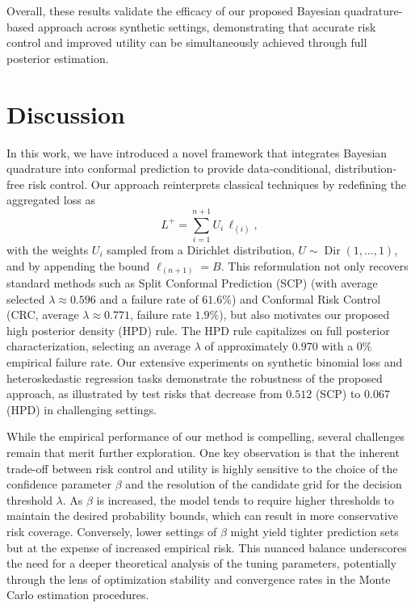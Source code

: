 \documentclass{article} %
\begin{document}
Overall, these results validate the efficacy of our proposed Bayesian quadrature-based approach across synthetic settings, demonstrating that accurate risk control and improved utility can be simultaneously achieved through full posterior estimation. 

\section{Discussion}
In this work, we have introduced a novel framework that integrates Bayesian quadrature into conformal prediction to provide data‐conditional, distribution‐free risk control. Our approach reinterprets classical techniques by redefining the aggregated loss as 
\[
L^+ = \sum_{i=1}^{n+1} U_i\, \ell_{(i)},
\]
with the weights \(U_i\) sampled from a Dirichlet distribution, \(U \sim \operatorname{Dir}(1,\dots,1)\), and by appending the bound \(\ell_{(n+1)} = B\). This reformulation not only recovers standard methods such as Split Conformal Prediction (SCP) (with average selected \(\lambda \approx 0.596\) and a failure rate of \(61.6\%\)) and Conformal Risk Control (CRC, average \(\lambda \approx 0.771\), failure rate \(1.9\%\)), but also motivates our proposed high posterior density (HPD) rule. The HPD rule capitalizes on full posterior characterization, selecting an average \(\lambda\) of approximately \(0.970\) with a \(0\%\) empirical failure rate. Our extensive experiments on synthetic binomial loss and heteroskedastic regression tasks demonstrate the robustness of the proposed approach, as illustrated by test risks that decrease from \(0.512\) (SCP) to \(0.067\) (HPD) in challenging settings.

While the empirical performance of our method is compelling, several challenges remain that merit further exploration. One key observation is that the inherent trade-off between risk control and utility is highly sensitive to the choice of the confidence parameter \(\beta\) and the resolution of the candidate grid for the decision threshold \(\lambda\). As \(\beta\) is increased, the model tends to require higher thresholds to maintain the desired probability bounds, which can result in more conservative risk coverage. Conversely, lower settings of \(\beta\) might yield tighter prediction sets but at the expense of increased empirical risk. This nuanced balance underscores the need for a deeper theoretical analysis of the tuning parameters, potentially through the lens of optimization stability and convergence rates in the Monte Carlo estimation procedures.
\end{document}
